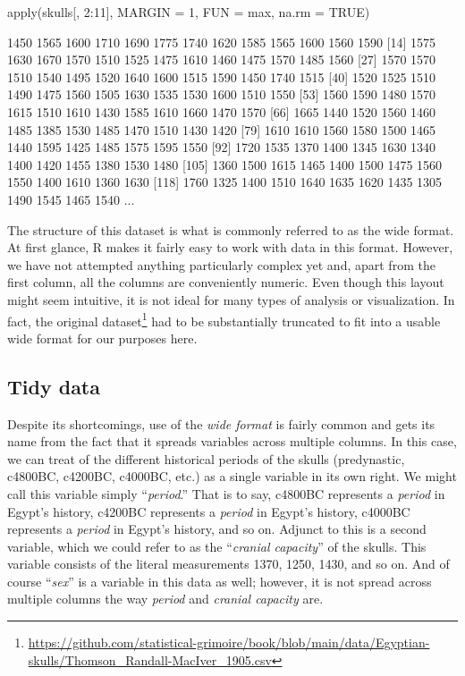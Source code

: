 \begin{inR}
apply(skulls[, 2:11], MARGIN = 1, FUN = max, na.rm = TRUE)
\end{inR}

\begin{outR}
  [1] 1450 1565 1600 1710 1690 1775 1740 1620 1585 1565 1600 1560 1590
 [14] 1575 1630 1670 1570 1510 1525 1475 1610 1460 1475 1570 1485 1560
 [27] 1570 1570 1510 1540 1495 1520 1640 1600 1515 1590 1450 1740 1515
 [40] 1520 1525 1510 1490 1475 1560 1505 1630 1535 1530 1600 1510 1550
 [53] 1560 1590 1480 1570 1615 1510 1610 1430 1585 1610 1660 1470 1570
 [66] 1665 1440 1520 1560 1460 1485 1385 1530 1485 1470 1510 1430 1420
 [79] 1610 1610 1560 1580 1500 1465 1440 1595 1425 1485 1575 1595 1550
 [92] 1720 1535 1370 1400 1345 1630 1340 1400 1420 1455 1380 1530 1480
[105] 1360 1500 1615 1465 1400 1500 1475 1560 1550 1400 1610 1360 1630
[118] 1760 1325 1400 1510 1640 1635 1620 1435 1305 1490 1545 1465 1540
...
\end{outR}

The structure of this dataset is what is commonly referred to as the \gls{wide format}. At first glance, R makes it fairly easy to work with data in this format. However, we have not attempted anything particularly complex yet and, apart from the first column, all the columns are conveniently numeric. Even though this layout might seem intuitive, it is not ideal for many types of analysis or visualization. In fact, the original dataset\footnote{\url{https://github.com/statistical-grimoire/book/blob/main/data/Egyptian-skulls/Thomson_Randall-MacIver_1905.csv}} had to be substantially truncated to fit into a usable wide format for our purposes here.

\subsection{Tidy data}

Despite its shortcomings, use of the \textit{wide format} is fairly common and gets its name from the fact that it spreads variables across multiple columns. In this case, we can treat of the different historical periods of the skulls (predynastic, c4800BC, c4200BC, c4000BC, etc.) as a single variable in its own right. We might call this variable simply ``\textit{period}.'' That is to say, c4800BC represents a \textit{period} in Egypt's history, c4200BC represents a \textit{period} in Egypt's history, c4000BC represents a \textit{period} in Egypt's history, and so on. Adjunct to this is a second variable, which we could refer to as the ``\textit{cranial capacity}'' of the skulls. This variable consists of the literal measurements 1370, 1250, 1430, and so on. And of course ``\textit{sex}'' is a variable in this data as well; however, it is not spread across multiple columns the way \textit{period} and \textit{cranial capacity} are. 

